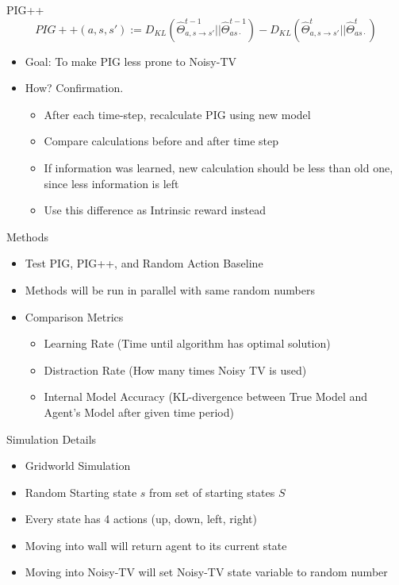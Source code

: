 	
	\begin{frame}[fragile]{PIG++}
		\[ PIG++ (a,s,s') := D_{KL}(\hat{\Theta}_{a,s \rightarrow s'}^{t-1} || \hat{\Theta}_{as\cdot}^{t-1}) - D_{KL}(\hat{\Theta}_{a,s \rightarrow s'}^{t} || \hat{\Theta}_{as\cdot}^{t}) \]
		\begin{itemize}
			\item {Goal: To make PIG less prone to Noisy-TV}
			\item {How? Confirmation.}
			\begin{itemize}
				\item {After each time-step, recalculate PIG using new model}
				\item {Compare calculations before and after time step}
				\item {If information was learned, new calculation should be less than old one, since less information is left}
				\item {Use this difference as Intrinsic reward instead}
			\end{itemize}
		\end{itemize}
	\end{frame}
	
	
	\begin{frame}[fragile]{Methods}
		\begin{itemize}
			\item {Test PIG, PIG++, and Random Action Baseline}
			\item {Methods will be run in parallel with same random numbers}
			\item {Comparison Metrics}
			\begin{itemize}
				\item {Learning Rate (Time until algorithm has optimal solution)}
				\item {Distraction Rate (How many times Noisy TV is used)}
				\item {Internal Model Accuracy (KL-divergence between True Model and Agent's Model after given time period)}
			\end{itemize}
		\end{itemize}
	\end{frame}
	
	
	\begin{frame}[fragile]{Simulation Details}
		\begin{itemize}
			\item {Gridworld Simulation}
			\item {Random Starting state $s$ from set of starting states $S$}
			\item {Every state has 4 actions (up, down, left, right)}
			\item {Moving into wall will return agent to its current state}
			\item {Moving into Noisy-TV will set Noisy-TV state variable to random number}
		\end{itemize}
	\end{frame}
	
